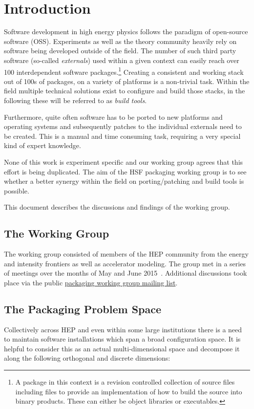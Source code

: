 \documentclass[12pt,a4paper]{article}
\begin{document}
\section{Introduction}

Software development in high energy physics follows the paradigm of open-source software (OSS). Experiments as well as the theory community heavily rely on software being developed outside of the field. The number of such third party software (so-called \emph{externals}) used within a given context can easily reach over 100 interdependent software packages.\footnote{ A package in this context is a revision controlled collection of source files including files to provide an implementation of how to build the source into binary products. These can either be object libraries or executables.}
Creating a consistent and working stack out of 100s of packages, on a variety of platforms is a non-trivial task. Within the field multiple technical solutions exist to configure and build those stacks, in the following these will be referred to as \emph{build tools}.

Furthermore, quite often software has to be ported to new platforms and operating systems and subsequently patches to the individual externals need to be created. This is a manual and time consuming task, requiring a very special kind of expert knowledge.

None of this work is experiment specific and our working group agrees that this effort is being duplicated. The aim of the HSF packaging working group is to see whether a better synergy within the field on porting/patching and build tools is possible.

This document describes the discussions and findings of the working group.
\subsection{The Working Group}
The working group consisted of members of the HEP community from the energy and intensity frontiers as well as accelerator modeling. The group met in a series of meetings over the months of May and June 2015~\cite{meetings}.
Additional discussions took place via the public \href{https://groups.google.com/forum/#!forum/hep-sf-packaging-wg}{packaging working group mailing list}.
\subsection{The Packaging Problem Space}
Collectively across HEP and even within some large institutions there is
a need to maintain software installations which span a broad
configuration space.  It is helpful to consider this as an actual
multi-dimensional space and decompose it along the following orthogonal
and discrete dimensions:
\end{document}
